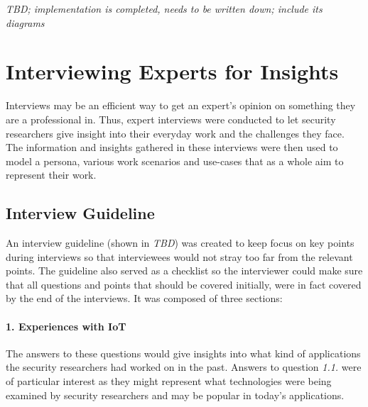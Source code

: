 



\emph{TBD; implementation is completed, needs to be written down; include its diagrams} %

\section{Interviewing Experts for Insights}
\label{sec:interviews}
Interviews may be an efficient way to get an expert’s opinion on something they are a professional in. Thus, expert interviews were conducted to let security researchers give insight into their everyday work and the challenges they face. The information and insights gathered in these interviews were then used to model a persona, various work scenarios and use-cases that as a whole aim to represent their work.

\subsection{Interview Guideline}
An interview guideline (shown in \emph{TBD}) %
was created to keep focus on key points during interviews so that interviewees would not stray too far from the relevant points. The guideline also served as a checklist so the interviewer could make sure that all questions and points that should be covered  initially, were in fact covered by the end of the interviews. It was composed of three sections:

\paragraph{1. Experiences with IoT} The answers to these questions would give insights into what kind of applications the security researchers had worked on in the past. Answers to question \emph{1.1.} were of particular interest as they might represent what technologies were being examined by security researchers and may be popular in today’s applications.
